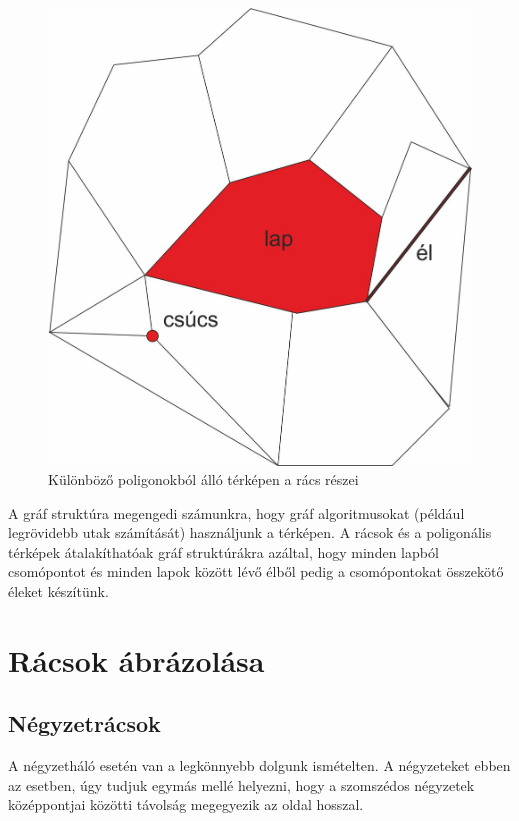 \begin{figure}[h!]
\centering
\includegraphics[scale=0.4]{kepek/PartsOfGrid2.jpg}
\caption{Különböző poligonokból álló térképen a rács részei}
\label{fig:PartsOfGrid2}
\end{figure}

A gráf struktúra megengedi számunkra, hogy gráf algoritmusokat (például legrövidebb utak számítását) használjunk a térképen. A rácsok és a poligonális térképek átalakíthatóak gráf struktúrákra azáltal, hogy minden lapból csomópontot és minden lapok között lévő élből pedig a csomópontokat összekötő éleket készítünk.

\section{Rácsok ábrázolása}

\subsection{Négyzetrácsok}

A négyzetháló esetén van a legkönnyebb dolgunk ismételten. A négyzeteket ebben az esetben, úgy tudjuk egymás mellé helyezni, hogy a szomszédos négyzetek középpontjai közötti távolság megegyezik az oldal hosszal. 

